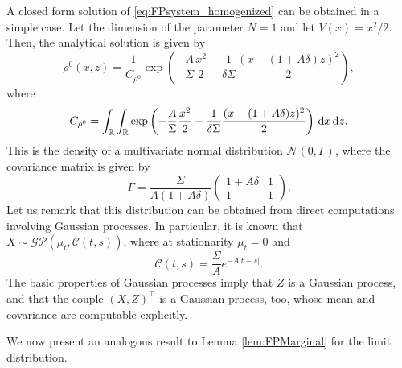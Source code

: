 \documentclass[10pt]{article}
\begin{document}
\begin{example}\label{ex:OrnUhl} A closed form solution of \eqref{eq:FPsystem_homogenized} can be obtained in a simple case. Let the dimension of the parameter $N=1$ and let $V(x) = x^2/2$. Then, the analytical solution is given by
	\begin{equation}
	\rho^0(x,z) = \frac{1}{C_{\rho^0}} \exp\left(-\frac{A}{\Sigma} \frac{x^2}{2} - \frac{1}{\delta \Sigma} \frac{(x - (1+A \delta)z)^2}{2}\right),
	\end{equation}
	where
	\begin{equation}
	C_{\rho^0} = \int_{\mathbb{R}} \int_{\mathbb{R}} \exp\left(-\frac{A}{\Sigma} \frac{x^2}{2} - \frac{1}{\delta \Sigma} \frac{(x - (1+A \delta)z)^2}{2}\right) \,\mathrm{d} x \,\mathrm{d} z.
	\end{equation}
	This is the density of a multivariate normal distribution $\mathcal N(0, \Gamma)$, where the covariance matrix is given by
	\begin{equation}
	\Gamma = \frac{\Sigma}{A (1 + A\delta)} \begin{pmatrix} 1+A\delta & 1 \\ 1 & 1 \end{pmatrix}.
	\end{equation}
	Let us remark that this distribution can be obtained from direct computations involving Gaussian processes. In particular, it is known that $X \sim \mathcal{GP}(\mu_t, \mathcal C(t, s))$, where at stationarity $\mu_t = 0$ and
	\begin{equation}
	\mathcal C(t, s) = \frac{\Sigma}{A} e^{-A|t-s|}.
	\end{equation}
	The basic properties of Gaussian processes imply that $Z$ is a Gaussian process, and that the couple $(X, Z)^\top$ is a Gaussian process, too, whose mean and covariance are computable explicitly.
\end{example}

We now present an analogous result to Lemma \ref{lem:FPMarginal} for the limit distribution.
\end{document}
